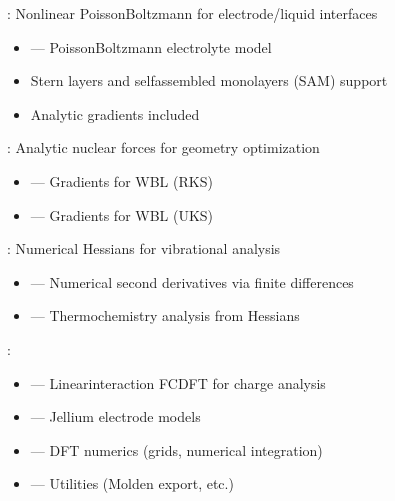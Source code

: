 \documentclass[letterpaper,10pt,english]{sphinxmanual}
\begin{document}
\sphinxAtStartPar
{}: Non\sphinxhyphen{}linear Poisson\sphinxhyphen{}Boltzmann for electrode/liquid interfaces
\begin{itemize}
\item {} 
\sphinxAtStartPar
{} — Poisson\sphinxhyphen{}Boltzmann electrolyte model

\item {} 
\sphinxAtStartPar
Stern layers and self\sphinxhyphen{}assembled monolayers (SAM) support

\item {} 
\sphinxAtStartPar
Analytic gradients included

\end{itemize}

\sphinxAtStartPar
{}: Analytic nuclear forces for geometry optimization
\begin{itemize}
\item {} 
\sphinxAtStartPar
{} — Gradients for WBL (RKS)

\item {} 
\sphinxAtStartPar
{} — Gradients for WBL (UKS)

\end{itemize}

\sphinxAtStartPar
{}: Numerical Hessians for vibrational analysis
\begin{itemize}
\item {} 
\sphinxAtStartPar
{} — Numerical second derivatives via finite differences

\item {} 
\sphinxAtStartPar
{} — Thermochemistry analysis from Hessians

\end{itemize}

\sphinxAtStartPar
{}:
\begin{itemize}
\item {} 
\sphinxAtStartPar
{} — Linear\sphinxhyphen{}interaction FC\sphinxhyphen{}DFT for charge analysis

\item {} 
\sphinxAtStartPar
{} — Jellium electrode models

\item {} 
\sphinxAtStartPar
{} — DFT numerics (grids, numerical integration)

\item {} 
\sphinxAtStartPar
{} — Utilities (Molden export, etc.)

\end{itemize}
\end{document}
